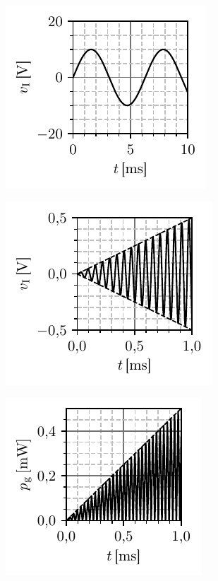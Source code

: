 \noindent
\begin{figure}[ht!]
    \hspace*{0pt}%
    \begin{subfigure}[b]{0.32\textwidth}
        \includegraphics[scale=1]{fig/LC_a.pdf}
        \caption{}
        \label{fig:\ID.a}
    \end{subfigure}
    \begin{subfigure}[b]{0.32\textwidth}
        \includegraphics[scale=1]{fig/LC_b.pdf}
        \caption{}
        \label{fig:\ID.b}
    \end{subfigure}
    \begin{subfigure}[b]{0.32\textwidth}
        \includegraphics[scale=1]{fig/LC_v.pdf}
        \caption{}
        \label{fig:\ID.v}
    \end{subfigure}
    \caption{}
    \label{fig:\ID.2}
\end{figure}



